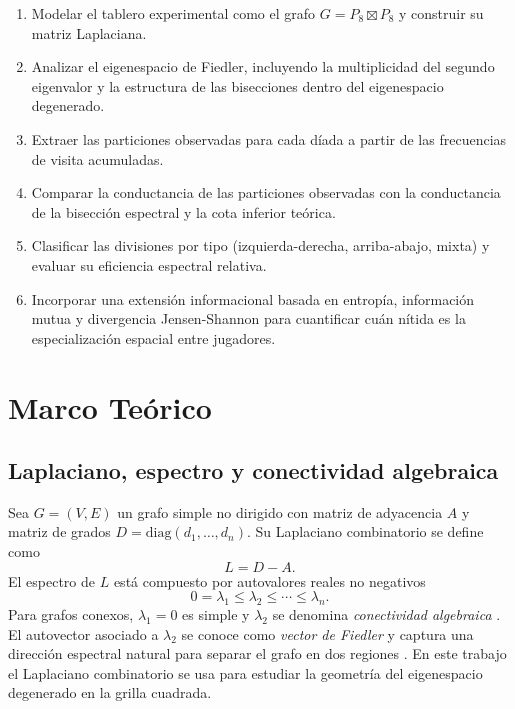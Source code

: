 \documentclass[conference]{IEEEtran}
\begin{document}
\begin{enumerate}
    \item Modelar el tablero experimental como el grafo $G = P_8 \boxtimes P_8$ y construir su matriz Laplaciana.
    
    \item Analizar el eigenespacio de Fiedler, incluyendo la multiplicidad del segundo eigenvalor y la estructura de las bisecciones dentro del eigenespacio degenerado.
    
    \item Extraer las particiones observadas para cada díada a partir de las frecuencias de visita acumuladas.
    
    \item Comparar la conductancia de las particiones observadas con la conductancia de la bisección espectral y la cota inferior teórica.
    
    \item Clasificar las divisiones por tipo (izquierda-derecha, arriba-abajo, mixta) y evaluar su eficiencia espectral relativa.

    \item Incorporar una extensión informacional basada en entropía, información mutua y divergencia Jensen-Shannon para cuantificar cuán nítida es la especialización espacial entre jugadores.
\end{enumerate}

\section{Marco Teórico}

\subsection{Laplaciano, espectro y conectividad algebraica}

Sea $G = (V,E)$ un grafo simple no dirigido con matriz de adyacencia $A$ y matriz de grados $D = \mathrm{diag}(d_1,\dots,d_n)$. Su Laplaciano combinatorio se define como
\begin{equation}
L = D - A.
\end{equation}
El espectro de $L$ está compuesto por autovalores reales no negativos
\begin{equation}
0 = \lambda_1 \le \lambda_2 \le \cdots \le \lambda_n.
\end{equation}
Para grafos conexos, $\lambda_1 = 0$ es simple y $\lambda_2$ se denomina \textit{conectividad algebraica} \cite{fiedler1973,mohar1991}. El autovector asociado a $\lambda_2$ se conoce como \textit{vector de Fiedler} y captura una dirección espectral natural para separar el grafo en dos regiones \cite{chung1997,vonluxburg2007}. En este trabajo el Laplaciano combinatorio se usa para estudiar la geometría del eigenespacio degenerado en la grilla cuadrada.
\end{document}
